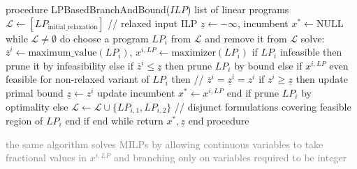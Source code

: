 \documentclass[a4paper, 11pt]{report}
\begin{document}
\begin{pseudocode}
procedure LPBasedBranchAndBound($ILP$)
    list of linear programs $\mathcal{L} \gets [LP_{\text{initial\_relaxation}}]$ // relaxed input ILP
    $\underline{z} \gets -\infty$, incumbent $x^* \gets \text{NULL}$
    while $\mathcal{L} \neq \emptyset$ do
        choose a program $LP_i$ from $\mathcal{L}$ and remove it from $\mathcal{L}$
        solve: $\overline{z}^i \gets \text{maximum\_value}(LP_i)$, $x^{i,LP} \gets \text{maximizer}(LP_i)$
        if $LP_i$ infeasible then
            prune it by infeasibility
        else if $\overline{z}^i \leq \underline{z}$ then
            prune $LP_i$ by bound
        else if $x^{i,LP}$ even feasible for non-relaxed variant of $LP_i$ then // $\overline{z}^i = \underline{z}^i = z^i$
            if $z^i \geq \underline{z}$ then
                update primal bound $\underline{z} \gets z^i$
                update incumbent $x^* \gets x^{i,LP}$
            end if
            prune $LP_i$ by optimality
        else
            $\mathcal{L} \gets \mathcal{L} \cup \{LP_{i,1}, LP_{i,2}\}$ // disjunct formulations covering feasible region of $LP_i$
        end if
    end while
    return $x^*, \underline{z}$
end procedure
\end{pseudocode}

\textcolor{gray}{the same algorithm solves MILPs by allowing continuous variables to take fractional values in $x^{i,LP}$ and branching only on variables required to be integer}
\end{document}
